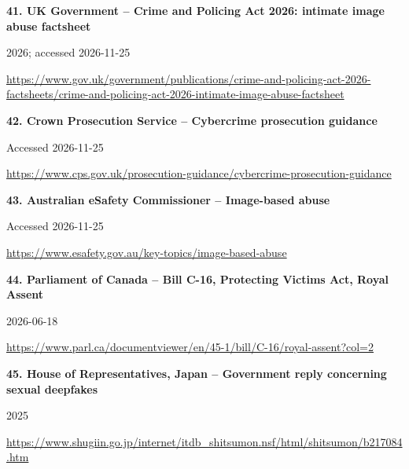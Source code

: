 \documentclass[11pt,a4paper]{article}
\begin{document}
\noindent\begin{minipage}{\linewidth}\textbf{41. UK Government -- Crime and Policing Act 2026: intimate image abuse factsheet}\par{\small 2026; accessed 2026-11-25\par\url{https://www.gov.uk/government/publications/crime-and-policing-act-2026-factsheets/crime-and-policing-act-2026-intimate-image-abuse-factsheet}}\par
\end{minipage}\par\vspace{2mm}
\noindent\begin{minipage}{\linewidth}\textbf{42. Crown Prosecution Service -- Cybercrime prosecution guidance}\par{\small Accessed 2026-11-25\par\url{https://www.cps.gov.uk/prosecution-guidance/cybercrime-prosecution-guidance}}\par
\end{minipage}\par\vspace{2mm}
\noindent\begin{minipage}{\linewidth}\textbf{43. Australian eSafety Commissioner -- Image-based abuse}\par{\small Accessed 2026-11-25\par\url{https://www.esafety.gov.au/key-topics/image-based-abuse}}\par
\end{minipage}\par\vspace{2mm}
\noindent\begin{minipage}{\linewidth}\textbf{44. Parliament of Canada -- Bill C-16, Protecting Victims Act, Royal Assent}\par{\small 2026-06-18\par\url{https://www.parl.ca/documentviewer/en/45-1/bill/C-16/royal-assent?col=2}}\par
\end{minipage}\par\vspace{2mm}
\noindent\begin{minipage}{\linewidth}\textbf{45. House of Representatives, Japan -- Government reply concerning sexual deepfakes}\par{\small 2025\par\url{https://www.shugiin.go.jp/internet/itdb_shitsumon.nsf/html/shitsumon/b217084.htm}}\par
\end{minipage}\par\vspace{2mm}
\end{document}
